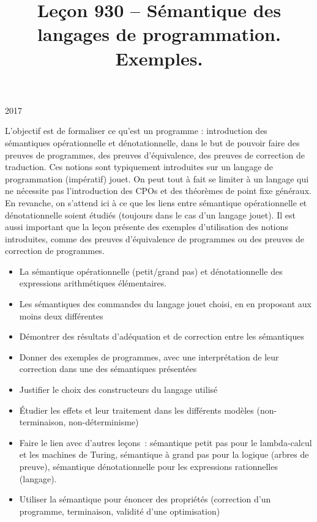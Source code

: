 \documentclass{agregfiche}
\title{Leçon 930 -- Sémantique des langages de programmation. Exemples.}
\begin{document}
\maketitle

\secrapports

\begin{rapport}{2017}

    L’objectif est de formaliser ce qu’est un programme : introduction des
    sémantiques opérationnelle et dénotationnelle, dans le but de pouvoir faire
    des preuves de programmes, des preuves d’équivalence, des preuves de
    correction de traduction. Ces notions sont typiquement introduites sur un
    langage de programmation (impératif) jouet. On peut tout à fait se limiter à
    un langage qui ne nécessite pas l’introduction des CPOs et des théorèmes de
    point fixe généraux. En revanche, on s’attend ici à ce que les liens entre
    sémantique opérationnelle et dénotationnelle soient étudiés (toujours dans le
    cas d’un langage jouet). Il est aussi important que la leçon présente des
    exemples d’utilisation des notions introduites, comme des preuves
    d’équivalence de programmes ou des preuves de correction de programmes.

\end{rapport}

\secindispensables

\begin{itemize}
    \item La sémantique opérationnelle (petit/grand pas) et dénotationnelle
        des expressions arithmétiques élémentaires.
    \item Les sémantiques des commandes du langage jouet choisi, en en proposant 
        aux moins deux différentes
    \item Démontrer des résultats d'adéquation et de correction entre les 
        sémantiques
    \item Donner des exemples de programmes, avec une interprétation de leur 
        correction dans une des sémantiques présentées
    \item Justifier le choix des constructeurs du langage utilisé
    \item Étudier les effets et leur traitement dans les différents modèles 
        (non-terminaison, non-déterminisme)
    \item Faire le lien avec d'autres leçons~: 
        sémantique petit pas pour le lambda-calcul et les machines de Turing,
        sémantique à grand pas pour la logique (arbres de preuve),
        sémantique dénotationnelle pour les expressions rationnelles (langage).
    \item Utiliser la sémantique pour énoncer des propriétés (correction d'un
        programme, terminaison, validité d'une optimisation)
\end{itemize}
\end{document}
